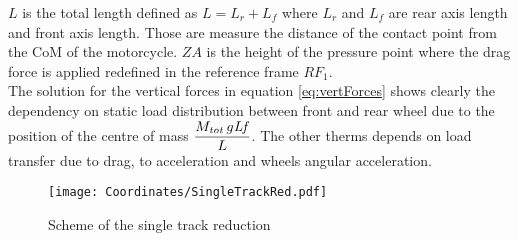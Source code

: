 $L$ is the total length defined as $L= L_r+L_f$ where $L_r$ and $L_f$ are rear axis length and front axis length. Those are measure the distance of the contact point from the CoM of the motorcycle. $ZA$ is the height of the pressure point where the drag force is applied redefined in the reference frame $RF_1$.\\
The solution for the vertical forces in equation \ref{eq:vertForces} shows clearly the dependency on static load distribution between front and rear wheel due to the position of the centre of mass $\displaystyle{\frac {M_{{\it tot}}\,g{\it Lf}}{L}}$. The other therms depends on load transfer due to drag, to acceleration and wheels angular acceleration.\\
%
\begin{figure}[htb]
    \centering
    \texttt{[image: Coordinates/SingleTrackRed.pdf]}
    \caption{Scheme of the single track reduction}
    \label{fig:SigngleTrackRed}
\end{figure}